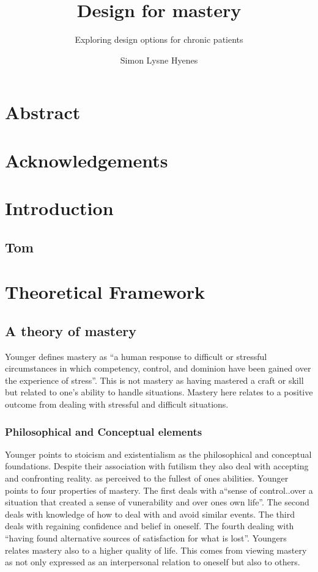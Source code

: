\documentclass[UKenglish]{uiophd}
\author{Simon Lysne Hyenes}
\title{Design for mastery}
\subtitle{Exploring design options for chronic patients}
\begin{document}
\frontmatter
\ififorside
\chapter*{Abstract}

\chapter*{Acknowledgements}
\clearpage
\tableofcontents
{}

\clearpage

\listoffigures
\listoftables


\mainmatter
\chapter{Introduction}
	\section{Tom}

\chapter{Theoretical Framework}
	\section{A theory of mastery}
		Younger defines mastery as ``a human response to difficult or stressful circumstances in which competency, control, and dominion have been gained over the experience of stress''\cite[p.76]{Younger1991Theory}. This is not mastery as having mastered a craft or skill but related to one's ability to handle situations. Mastery here relates to a positive outcome from dealing with stressful and difficult situations.
	
		\subsection{Philosophical and Conceptual elements}
			Younger points to stoicism and existentialism as the philosophical and conceptual foundations. Despite their association with futilism they also deal with accepting and confronting reality. as perceived to the fullest of ones abilities. 
			Younger points to four properties of mastery. The first deals with a``sense of control..over a situation that created a sense of vunerability and over ones own life''\cite[p.81]{Younger1991Theory}. The second deals with knowledge of how to deal with and avoid similar events. The third deals with regaining confidence and belief in oneself. The fourth dealing with ``having found alternative sources of satisfaction for what is lost''\cite[p.81]{Younger1991Theory}. Youngers relates mastery also to a higher quality of life. This comes from viewing mastery as not only expressed as an interpersonal relation to oneself but also to others. 
\end{document}
